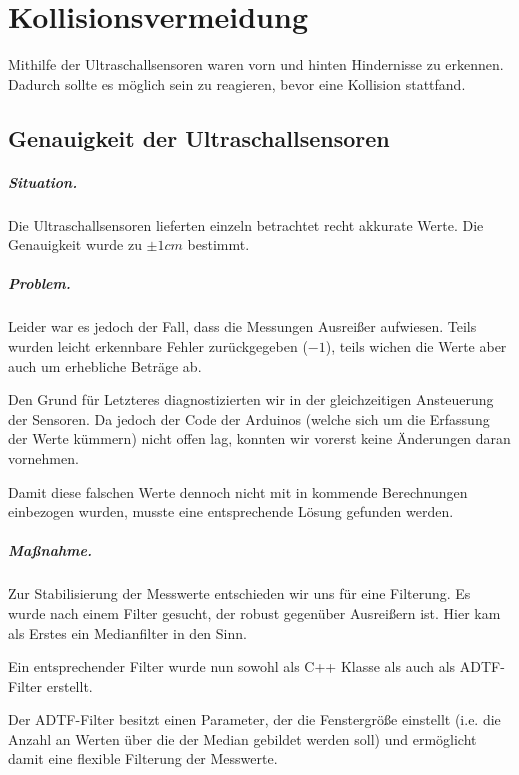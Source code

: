 \documentclass[a4paper,12pt]{report}
\begin{document}
\chapter{Kollisionsvermeidung}

	Mithilfe der Ultraschallsensoren waren vorn und hinten Hindernisse zu erkennen.
	Dadurch sollte es möglich sein zu reagieren, bevor eine Kollision stattfand.

\section{Genauigkeit der Ultraschallsensoren}

	\paragraph{Situation.}
	Die Ultraschallsensoren lieferten einzeln betrachtet recht akkurate Werte.
	Die Genauigkeit wurde zu $\pm1cm$ bestimmt.

	\paragraph{Problem.}
	Leider war es jedoch der Fall, dass die Messungen Ausreißer aufwiesen.
	Teils wurden leicht erkennbare Fehler zurückgegeben ($-1$), teils wichen die Werte aber auch um erhebliche Beträge ab.

	Den Grund für Letzteres diagnostizierten wir in der gleichzeitigen Ansteuerung der Sensoren.
	Da jedoch der Code der Arduinos (welche sich um die Erfassung der Werte kümmern) nicht offen lag, konnten wir vorerst keine Änderungen daran vornehmen.

	Damit diese falschen Werte dennoch nicht mit in kommende Berechnungen einbezogen wurden, musste eine entsprechende Lösung gefunden werden.

	\paragraph{Maßnahme.}
	Zur Stabilisierung der Messwerte entschieden wir uns für eine Filterung.
	Es wurde nach einem Filter gesucht, der robust gegenüber Ausreißern ist.
	Hier kam als Erstes ein Medianfilter in den Sinn.

	Ein entsprechender Filter wurde nun sowohl als C++ Klasse als auch als ADTF-Filter erstellt.

	Der ADTF-Filter besitzt einen Parameter, der die Fenstergröße einstellt (i.e. die Anzahl an Werten über die der Median gebildet werden soll) und ermöglicht damit eine flexible Filterung der Messwerte.
\end{document}
